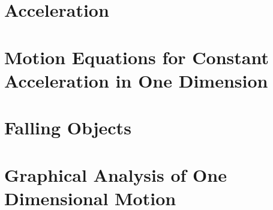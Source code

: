 \documentclass{article}
\begin{document}
\section{Acceleration}

\section{Motion Equations for Constant Acceleration in One Dimension}

\section{Falling Objects}

\section{Graphical Analysis of One Dimensional Motion}
\end{document}
